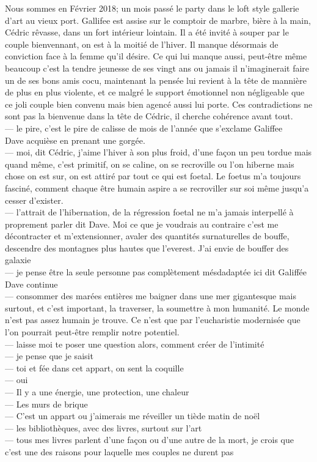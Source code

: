 \documentclass{article}
\begin{document}
Nous sommes en Février 2018; un mois passé le party dans le loft style gallerie
d'art au vieux port. Gallifee est assise sur le comptoir de marbre, bière à la
main, Cédric rêvasse, dans un fort intérieur lointain. Il a été invité à souper
par le couple bienvennant, on est à la moitié de l'hiver. Il manque désormais de
conviction face à la femme qu'il désire. Ce qui lui manque aussi, peut-être même
beaucoup c'est la tendre jeunesse de ses vingt ans ou jamais il n'imaginerait
faire un de ses bons amis cocu, maintenant la pensée lui revient à la tête de
mannière de plus en plus violente, et ce malgré le support émotionnel non
négligeable que ce joli couple bien convenu mais bien agencé aussi lui porte.
Ces contradictions ne sont pas la bienvenue dans la tête de Cédric, il cherche
cohérence avant tout. \\

--- le pire, c'est le pire de calisse de mois de l'année que s'exclame Galiffee\\
Dave acquièse en prenant une gorgée.\\
--- moi, dit Cédric, j'aime l'hiver à son plus froid, d'une façon un peu tordue mais quand même,
c'est primitif, on se caline, on se recroville ou l'on hiberne mais chose on est sur,
on est attiré par tout ce qui est foetal. Le foetus m'a toujours fasciné, comment
chaque être humain aspire a se recroviller sur soi même jusqu'a cesser d'exister.\\
--- l'attrait de l'hibernation, de la régression foetal ne m'a jamais interpellé
à proprement parler dit Dave. Moi ce que je voudrais au contraire c'est me décontracter
et m'extensionner, avaler des quantités surnaturelles de bouffe, descendre des montagnes
plus hautes que l'everest. J'ai envie de bouffer des galaxie\\
--- je pense être la seule personne pas complètement mésdadaptée ici dit Galiffée\\
Dave continue\\
--- consommer des marées entières me baigner dans une mer gigantesque mais surtout,
et c'est important, la traverser, la soumettre à mon humanité. Le monde n'est pas assez
humain je trouve. Ce n'est que par l'eucharistie modernisée que l'on pourrait peut-être
remplir notre potentiel.\\
--- laisse moi te poser une question alors, comment créer de l'intimité\\
--- je pense que je saisit\\
--- toi et fée dans cet appart, on sent la coquille\\
--- oui\\
--- Il y a une énergie, une protection, une chaleur\\
--- Les murs de brique\\
--- C'est un appart ou j'aimerais me réveiller un tiède matin de noël\\
--- les bibliothèques, avec des livres, surtout sur l'art\\
--- tous mes livres parlent d'une façon ou d'une autre de la mort,
je crois que c'est une des raisons pour laquelle mes couples ne durent pas\\
\end{document}
